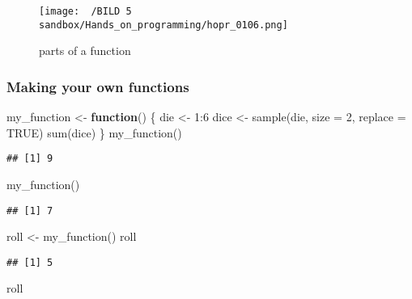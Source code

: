 \documentclass[
]{article}
\newenvironment{Shaded}{\begin{snugshade}}{\end{snugshade}}
\newcommand{\AttributeTok}[1]{\textcolor[rgb]{0.77,0.63,0.00}{#1}}
\newcommand{\ConstantTok}[1]{\textcolor[rgb]{0.00,0.00,0.00}{#1}}
\newcommand{\ControlFlowTok}[1]{\textcolor[rgb]{0.13,0.29,0.53}{\textbf{#1}}}
\newcommand{\DecValTok}[1]{\textcolor[rgb]{0.00,0.00,0.81}{#1}}
\newcommand{\FunctionTok}[1]{\textcolor[rgb]{0.00,0.00,0.00}{#1}}
\newcommand{\NormalTok}[1]{#1}
\newcommand{\OtherTok}[1]{\textcolor[rgb]{0.56,0.35,0.01}{#1}}
\newcommand{\SpecialCharTok}[1]{\textcolor[rgb]{0.00,0.00,0.00}{#1}}
\begin{document}
\begin{figure}
\centering
\texttt{[image: ~/BILD 5 sandbox/Hands\_on\_programming/hopr\_0106.png]}
\caption{parts of a function}
\end{figure}

\hypertarget{making-your-own-functions}{%
\subsubsection{Making your own
functions}\label{making-your-own-functions}}

\begin{Shaded}
\begin{Highlighting}[]
\NormalTok{my\_function }\OtherTok{\textless{}{-}} \ControlFlowTok{function}\NormalTok{() \{}
\NormalTok{  die }\OtherTok{\textless{}{-}} \DecValTok{1}\SpecialCharTok{:}\DecValTok{6}
\NormalTok{  dice }\OtherTok{\textless{}{-}} \FunctionTok{sample}\NormalTok{(die, }\AttributeTok{size =} \DecValTok{2}\NormalTok{, }\AttributeTok{replace =} \ConstantTok{TRUE}\NormalTok{)}
  \FunctionTok{sum}\NormalTok{(dice)}
\NormalTok{\}}
\FunctionTok{my\_function}\NormalTok{()}
\end{Highlighting}
\end{Shaded}

\begin{verbatim}
## [1] 9
\end{verbatim}

\begin{Shaded}
\begin{Highlighting}[]
\FunctionTok{my\_function}\NormalTok{()}
\end{Highlighting}
\end{Shaded}

\begin{verbatim}
## [1] 7
\end{verbatim}

\begin{Shaded}
\begin{Highlighting}[]
\NormalTok{roll }\OtherTok{\textless{}{-}} \FunctionTok{my\_function}\NormalTok{()}
\NormalTok{roll}
\end{Highlighting}
\end{Shaded}

\begin{verbatim}
## [1] 5
\end{verbatim}

\begin{Shaded}
\begin{Highlighting}[]
\NormalTok{roll}
\end{Highlighting}
\end{Shaded}
\end{document}
